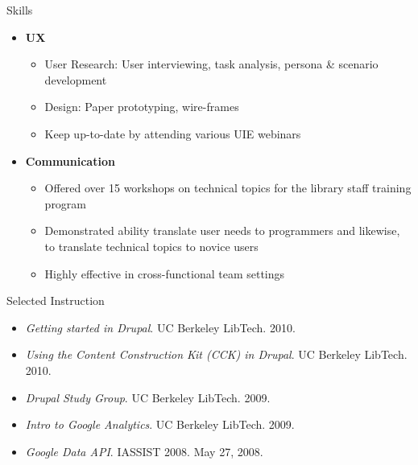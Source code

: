 \documentclass[11pt,oneside]{article}
\newenvironment{ressection}[1]{
	\vspace{4pt}
	{\fontfamily{phv}\selectfont\Large#1}
	\begin{itemize}
	\vspace{3pt}
}{
	\end{itemize}
}
\newcommand{\resitem}[1]{
	\vspace{-4pt}
	\item \begin{flushleft} #1 \end{flushleft}
}
\newcommand{\ressubitem}[1]{
	\vspace{-1pt}
	\item \begin{flushleft} #1 \end{flushleft}
}
\newenvironment{reslist}[1]{
	\resitem{\textbf{#1}}
	\vspace{-5pt}
	\begin{itemize}
}{
	\end{itemize}
}
\begin{document}
\begin{ressection}{Skills}
\begin{reslist}{UX}
	  \ressubitem{User Research: User interviewing, task analysis, persona \& scenario development}
	  
	  \ressubitem{Design: Paper prototyping, wire-frames}

    \ressubitem{Keep up-to-date by attending various UIE webinars}
    
	\end{reslist}
	
	\begin{reslist}{Communication}

    \ressubitem{Offered over 15 workshops on technical topics for the library staff training program}

    \ressubitem{Demonstrated ability translate user needs to programmers and likewise, to translate technical topics to novice users}

    \ressubitem{Highly effective in cross-functional team settings}

  \end{reslist}

\end{ressection}


\begin{ressection}{Selected Instruction}

	\resitem{\textit{Getting started in Drupal}. UC Berkeley LibTech. 2010.}

	\resitem{\textit{Using the Content Construction Kit (CCK) in Drupal}. UC Berkeley LibTech. 2010.}

	\resitem{\textit{Drupal Study Group}. UC Berkeley LibTech. 2009.}

	\resitem{\textit{Intro to Google Analytics}. UC Berkeley LibTech. 2009.}

	\resitem{\textit{Google Data API}. IASSIST 2008. May 27, 2008.}

\end{ressection}
\end{document}
